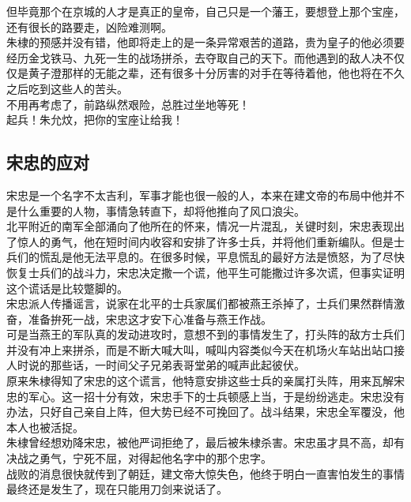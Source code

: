 \begin{multicols}{\theparacolNo}
但毕竟那个在京城的人才是真正的皇帝，自己只是一个藩王，要想登上那个宝座，还有很长的路要走，凶险难测啊。\\

朱棣的预感并没有错，他即将走上的是一条异常艰苦的道路，贵为皇子的他必须要经历金戈铁马、九死一生的战场拼杀，去夺取自己的天下。而他遇到的敌人决不仅仅是黄子澄那样的无能之辈，还有很多十分厉害的对手在等待着他，他也将在不久之后吃到这些人的苦头。\\

不用再考虑了，前路纵然艰险，总胜过坐地等死！\\

起兵！朱允炆，把你的宝座让给我！\\

\subsection{宋忠的应对}
宋忠是一个名字不太吉利，军事才能也很一般的人，本来在建文帝的布局中他并不是什么重要的人物，事情急转直下，却将他推向了风口浪尖。\\

北平附近的南军全部涌向了他所在的怀来，情况一片混乱，关键时刻，宋忠表现出了惊人的勇气，他在短时间内收容和安排了许多士兵，并将他们重新编队。但是士兵们的慌乱是他无法平息的。在很多时候，平息慌乱的最好方法是愤怒，为了尽快恢复士兵们的战斗力，宋忠决定撒一个谎，他平生可能撒过许多次谎，但事实证明这个谎话是比较蹩脚的。\\

宋忠派人传播谣言，说家在北平的士兵家属们都被燕王杀掉了，士兵们果然群情激奋，准备拚死一战，宋忠这才安下心准备与燕王作战。\\

可是当燕王的军队真的发动进攻时，意想不到的事情发生了，打头阵的敌方士兵们并没有冲上来拼杀，而是不断大喊大叫，喊叫内容类似今天在机场火车站出站口接人时说的那些话，一时间父子兄弟表哥堂弟的喊声此起彼伏。\\

原来朱棣得知了宋忠的这个谎言，他特意安排这些士兵的亲属打头阵，用来瓦解宋忠的军心。这一招十分有效，宋忠手下的士兵顿感上当，于是纷纷逃走。宋忠没有办法，只好自己亲自上阵，但大势已经不可挽回了。战斗结果，宋忠全军覆没，他本人也被活捉。\\

朱棣曾经想劝降宋忠，被他严词拒绝了，最后被朱棣杀害。宋忠虽才具不高，却有决战之勇气，宁死不屈，对得起他名字中的那个忠字。\\

战败的消息很快就传到了朝廷，建文帝大惊失色，他终于明白一直害怕发生的事情最终还是发生了，现在只能用刀剑来说话了。\\


\end{multicols}
